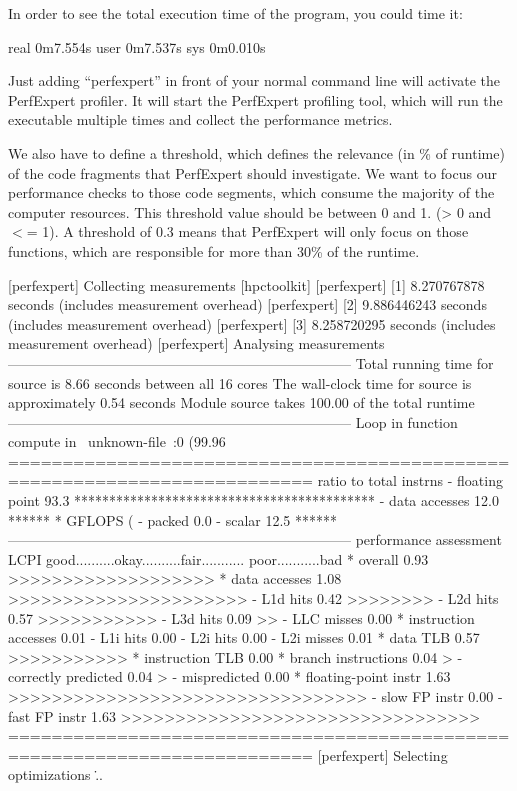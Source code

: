 In order to see the total execution time of the program, you could time it:

\begin{prompt}
real 0m7.554s
user 0m7.537s
sys 0m0.010s
\end{prompt}

Just adding ``perfexpert'' in front of your normal command line will activate the PerfExpert profiler.  It will start the PerfExpert profiling tool, which will run the executable multiple times and collect the performance metrics.

We also have to define a threshold, which defines the relevance (in \% of runtime) of the code fragments that PerfExpert should investigate. We want to focus our performance checks to those code segments, which consume the majority of the computer resources.  This threshold value should be between 0 and 1. (> 0 and $<$= 1).  A threshold of 0.3 means that PerfExpert will only focus on those functions, which are responsible for more than 30\% of the runtime.

\begin{prompt}
[perfexpert] Collecting measurements [hpctoolkit]
[perfexpert]    [1] 8.270767878 seconds (includes measurement overhead)
[perfexpert]    [2] 9.886446243 seconds (includes measurement overhead)
[perfexpert]    [3] 8.258720295 seconds (includes measurement overhead)
[perfexpert] Analysing measurements
--------------------------------------------------------------------------
Total running time for source is 8.66 seconds between all 16 cores
The wall-clock time for source is approximately 0.54 seconds
Module source takes 100.00 of the total runtime
--------------------------------------------------------------------------
Loop in function compute in ~unknown-file~:0 (99.96%
==========================================================================
ratio to total instrns     %
- floating point       93.3 *******************************************
- data accesses        12.0 ******
* GFLOPS (%
- packed                0.0
- scalar               12.5 ******
--------------------------------------------------------------------------
performance assessment LCPI good..........okay..........fair........... poor...........bad
* overall              0.93 >>>>>>>>>>>>>>>>>>>
* data accesses        1.08 >>>>>>>>>>>>>>>>>>>>>>
- L1d hits             0.42 >>>>>>>>
- L2d hits             0.57 >>>>>>>>>>>
- L3d hits             0.09 >>
- LLC misses           0.00
* instruction accesses 0.01
- L1i hits             0.00
- L2i hits             0.00
- L2i misses           0.01
* data TLB             0.57 >>>>>>>>>>>
* instruction TLB      0.00
* branch instructions  0.04 >
- correctly predicted  0.04 >
- mispredicted         0.00
* floating-point instr 1.63 >>>>>>>>>>>>>>>>>>>>>>>>>>>>>>>>>
- slow FP instr        0.00
- fast FP instr        1.63 >>>>>>>>>>>>>>>>>>>>>>>>>>>>>>>>>
==========================================================================
[perfexpert] Selecting optimizations
\...
\end{prompt}

